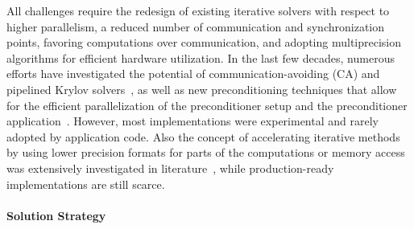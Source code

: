 All challenges require the redesign of existing iterative solvers with respect 
to higher parallelism, %
a reduced number of 
communication and synchronization points, favoring computations over 
communication, and adopting multiprecision algorithms for efficient hardware 
utilization. 
In the last few decades, numerous efforts 
have investigated the potential of communication-avoiding (CA) and pipelined 
Krylov solvers~\cite{yamazakiipdps2014,Cornelis2018TheCC},
as well as new preconditioning 
techniques that allow for the efficient parallelization of the preconditioner 
setup and the preconditioner 
application~\cite{chowisc2015,anzteuropa2015,ANZT20181}. 
However, most implementations were experimental and rarely adopted by application 
code.
Also the concept of accelerating iterative methods by using lower precision 
formats for parts of the computations or memory access was extensively 
investigated in literature~\cite{carson1,carson2,doi:10.1002/cpe.4460}, 
while production-ready implementations are still scarce.


\paragraph{Solution Strategy}

